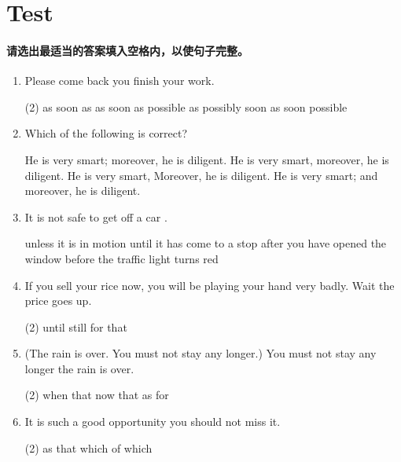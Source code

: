 \section{Test}

\paragraph{请选出最适当的答案填入空格内，以使句子完整。}

\begin{enumerate}
\item Please come back \ttu you finish your work.
\begin{tasks}(2)
  \task as soon as
  \task as soon as possible
  \task as possibly soon
  \task as soon possible
\end{tasks}

\item Which of the following is correct?
\begin{tasks}
  \task He is very smart; moreover, he is diligent.
  \task He is very smart, moreover, he is diligent.
  \task He is very smart, Moreover, he is diligent.
  \task He is very smart; and moreover, he is diligent.
\end{tasks}

\item It is not safe to get off a car \ttu.
\begin{tasks}
  \task unless it is in motion
  \task until it has come to a stop
  \task after you have opened the window
  \task before the traffic light turns red
\end{tasks}

\item If you sell your rice now, you will be playing your hand very badly. Wait \ttu the price goes up.
\begin{tasks}(2)
  \task until
  \task still
  \task for
  \task that
\end{tasks}

\item (The rain is over. You must not stay any longer.) You must not stay any longer \ttu the rain is over.
\begin{tasks}(2)
  \task when
  \task that
  \task now that
  \task as for
\end{tasks}

\item It is such a good opportunity \ttu you should not miss it.
\begin{tasks}(2)
  \task as
  \task that
  \task which
  \task of which
\end{tasks}


\end{enumerate}
